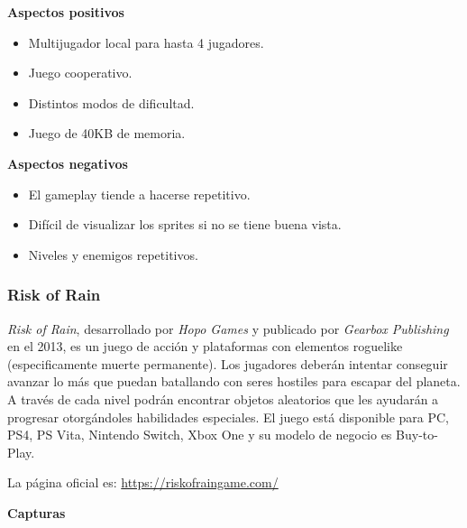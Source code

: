 \textbf{Aspectos positivos}
\begin{itemize}
    \item Multijugador local para hasta 4 jugadores.
    \item Juego cooperativo.
    \item Distintos modos de dificultad.
    \item Juego de 40KB de memoria.
\end{itemize}

\textbf{Aspectos negativos}
\begin{itemize}
    \item El gameplay tiende a hacerse repetitivo.
    \item Difícil de visualizar los sprites si no se tiene buena vista.
    \item Niveles y enemigos repetitivos.
\end{itemize}

\subsubsection{Risk of Rain}

\emph{Risk of Rain}, desarrollado por \emph{Hopo Games} y publicado por
\emph{Gearbox Publishing} en el 2013, es un juego de acción y plataformas con
elementos roguelike (especificamente muerte permanente). Los jugadores deberán
intentar conseguir avanzar lo más que puedan batallando con seres hostiles para
escapar del planeta. A través de cada nivel podrán encontrar objetos aleatorios
que les ayudarán a progresar otorgándoles habilidades especiales. El juego está
disponible para PC, PS4, PS Vita, Nintendo Switch, Xbox One y su modelo de
negocio es Buy-to-Play.

La página oficial es:
\url{https://riskofraingame.com/}

\textbf{Capturas}

